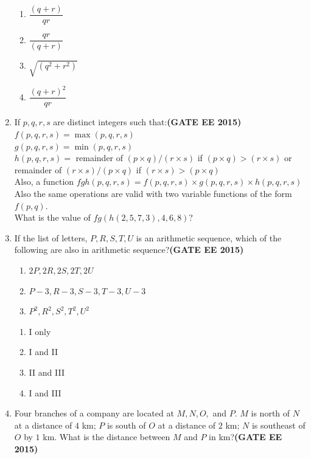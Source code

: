 \documentclass[a4paper,12pt]{exam}
\theoremstyle{remark}
\begin{document}
\begin{enumerate}
\begin{multicols}{4}
\begin{enumerate}
    \item $\dfrac{(q+r)}{qr}$
    \item $\dfrac{qr}{(q+r)}$
    \item $\sqrt{(q^2 + r^2)}$
    \item $\dfrac{(q+r)^2}{qr}$
\end{enumerate}
\end{multicols}
\item If $p, q, r, s$ are distinct integers such that:\hfill{\textbf{(GATE EE 2015)}} \\
$f(p, q, r, s) = \max(p, q, r, s)$ \\
$g(p, q, r, s) = \min(p, q, r, s)$ \\
$h(p, q, r, s) =$ remainder of $(p \times q)/(r \times s)$ if $(p \times q) > (r \times s)$ or remainder of $(r \times s)/(p \times q)$ if $(r \times s) > (p \times q)$ \\

Also, a function $fgh(p, q, r, s) = f(p, q, r, s) \times g(p, q, r, s) \times h(p, q, r, s)$ \\
Also the same operations are valid with two variable functions of the form $f(p, q)$. \\

What is the value of $fg(h(2,5,7,3), 4, 6, 8)$?
\item If the list of letters, $P, R, S, T, U$ is an arithmetic sequence, which of the following are also in arithmetic sequence?\hfill{\textbf{(GATE EE 2015)}} \\

\begin{enumerate}
\item $2P, 2R, 2S, 2T, 2U$
\item $P-3, R-3, S-3, T-3, U-3$
\item $P^2, R^2, S^2, T^2, U^2$
\end{enumerate}

\begin{multicols}{4}
\begin{enumerate}
\item I only
\item I and II
\item II and III
\item I and III
\end{enumerate}
\end{multicols}
\item Four branches of a company are located at $M, N, O,$ and $P$. 
$M$ is north of $N$ at a distance of $4$ km; $P$ is south of $O$ at a distance of $2$ km; 
$N$ is southeast of $O$ by $1$ km. What is the distance between $M$ and $P$ in km?\hfill{\textbf{(GATE EE 2015)}} \\


\end{enumerate}
\end{document}
